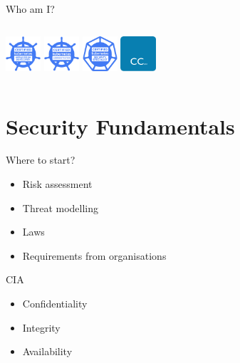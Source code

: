 \documentclass{dcpresentation}
\begin{document}
\begin{frame}{Who am I?}
 \begin{columns}
  \includegraphics[height=1.3cm]{img/ckad.png}
  \includegraphics[height=1.3cm]{img/cka.png}
  \includegraphics[height=1.3cm]{img/cks.png}
  \includegraphics[height=1.3cm]{img/cc.png}
  \end{columns}
\end{frame}

\section{Security Fundamentals}

\begin{frame}{Where to start?}
 \begin{itemize}
  \item Risk assessment
  \item Threat modelling
  \item Laws
  \item Requirements from organisations
 \end{itemize}
\end{frame}

\begin{frame}{CIA}
 \begin{itemize}
  \item Confidentiality
  \item Integrity
  \item Availability
 \end{itemize}
\end{frame}
\end{document}

